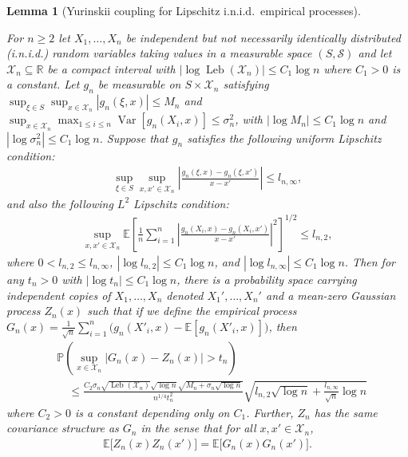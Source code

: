 \documentclass[11pt,lof]{puthesis}
\renewcommand{\P}{\ensuremath{\mathbb{P}}}
\newcommand{\R}{\ensuremath{\mathbb{R}}}
\newcommand{\E}{\ensuremath{\mathbb{E}}}
\newcommand{\cX}{\ensuremath{\mathcal{X}}}
\newcommand{\cS}{\ensuremath{\mathcal{S}}}
\DeclareMathOperator{\Var}{Var}
\DeclareMathOperator{\Leb}{Leb}
\theoremstyle{break}
\newtheorem{lemma}{Lemma}[section]
\theoremstyle{proof}
\begin{document}
\begin{lemma}[Yurinskii coupling for Lipschitz i.n.i.d.\ empirical processes]
\label{lem:kernel_app_yurinskii_corollary}

For $n \geq 2$ let $X_1, \dots, X_n$
be independent but not necessarily identically distributed
(i.n.i.d.) random variables
taking values in a measurable space $(S, \cS)$
and let $\cX_n \subseteq \R$
be a compact interval
with $\left|\log \Leb(\cX_n)\right| \leq C_1 \log n$
where $C_1 > 0$ is a constant.
Let $g_n$ be measurable on $S \times \cX_n$ satisfying
$\sup_{\xi \in S} \sup_{x \in \cX_n} |g_n(\xi, x)| \leq M_n$
and
$\sup_{x \in \cX_n} \max_{1 \leq i \leq n} \Var[g_n(X_i, x)]
\leq \sigma_n^2$,
with $\left|\log M_n\right| \leq C_1 \log n$
and $\left|\log \sigma_n^2\right| \leq C_1 \log n$.
Suppose that $g_n$ satisfies the following uniform
Lipschitz condition:
%
\begin{align*}
\sup_{\xi \in S}
\sup_{x,x' \in \cX_n}
\left|
\frac{g_n(\xi, x) - g_n(\xi, x')}
{x-x'}
\right|
\leq
l_{n,\infty},
\end{align*}
%
and also the following $L^2$
Lipschitz condition:
%
\begin{align*}
\sup_{x,x' \in \cX_n}
\E\left[
\frac{1}{n}
\sum_{i=1}^n
\left|
\frac{g_n(X_i, x) - g_n(X_i, x')}
{x-x'}
\right|^2
\right]^{1/2}
\leq
l_{n,2},
\end{align*}
%
where $0 < l_{n,2} \leq l_{n,\infty}$,
$\left|\log l_{n,2}\right| \leq C_1 \log n$, and
$\left|\log l_{n,\infty}\right| \leq C_1 \log n$.
Then for any $t_n > 0$ with
$\left|\log t_n\right| \leq C_1 \log n$,
there is a probability space carrying
independent copies of $X_1, \ldots, X_n$ denoted $X_1', \ldots, X_n'$
and a mean-zero Gaussian process $Z_n(x)$
such that if we define the empirical process
%
$G_n(x) = \frac{1}{\sqrt n} \sum_{i=1}^n
\big( g_n(X'_i,x) - \E[g_n(X'_i,x)] \big)$,
%
then
%
\begin{align*}
&\P\left(
\sup_{x \in \cX_n}
\big|
G_n(x) - Z_n(x)
\big|
> t_n
\right) \\
&\quad\leq
\frac{
C_2
\sigma_n
\sqrt{\Leb(\cX_n)}
\sqrt{\log n}
\sqrt{M_n + \sigma_n\sqrt{\log n}}
}{n^{1/4} t_n^2}
\sqrt{
l_{n,2}
\sqrt{\log n}
+ \frac{l_{n,\infty}}{\sqrt n}
\log n}
\end{align*}
%
where $C_2 > 0$ is a constant depending only on $C_1$.
Further, $Z_n$
has the same covariance structure as $G_n$
in the sense that for all $x, x' \in \cX_n$,
%
\begin{align*}
\E\big[Z_n(x) Z_n(x')\big]
= \E\big[G_n(x) G_n(x')\big].
\end{align*}

\end{lemma}
\end{document}

